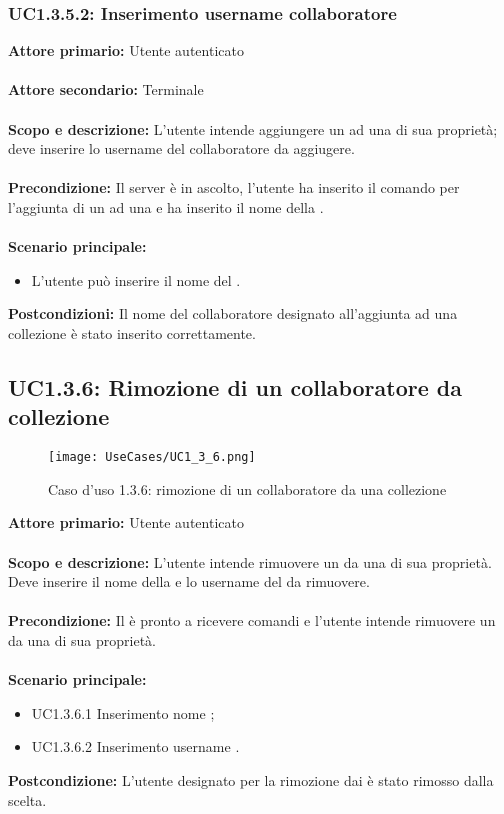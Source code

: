 \documentclass{scalatekids-article}
\begin{document}
\subsubsection{UC1.3.5.2: Inserimento username collaboratore}

\textbf{Attore primario:} Utente autenticato\\ \\
\textbf{Attore secondario:} Terminale\\ \\
\textbf{Scopo e descrizione:} L'utente intende aggiungere un  ad una  di sua proprietà; deve inserire lo username del collaboratore da aggiugere.\\ \\
\textbf{Precondizione:} Il server è in ascolto, l'utente ha inserito il comando per l'aggiunta di un  ad una  e ha inserito il nome della .\\ \\
\textbf{Scenario principale:}
\begin{itemize}
  \item L'utente può inserire il nome del .
\end{itemize}
\textbf{Postcondizioni:} Il nome del collaboratore designato all'aggiunta ad una collezione è stato inserito correttamente.

\subsection{UC1.3.6: Rimozione di un collaboratore da collezione}
\begin{figure}[H]
  \begin{center}
    \texttt{[image: UseCases/UC1\_3\_6.png]}
    \caption*{Caso d'uso 1.3.6: rimozione di un collaboratore da una collezione}
  \end{center}
\end{figure}
\textbf{Attore primario:} Utente autenticato\\ \\
\textbf{Scopo e descrizione:} L'utente intende rimuovere un  da una  di sua proprietà. Deve inserire il nome della  e lo username del  da rimuovere.\\ \\
\textbf{Precondizione:} Il  è pronto a ricevere comandi e l'utente intende rimuovere un  da una  di sua proprietà.\\ \\
\textbf{Scenario principale:}
\begin{itemize}
  \item UC1.3.6.1 Inserimento nome ;
  \item UC1.3.6.2 Inserimento username .
\end{itemize}
\textbf{Postcondizione:} L'utente designato per la rimozione dai  è stato rimosso dalla  scelta.
\end{document}
